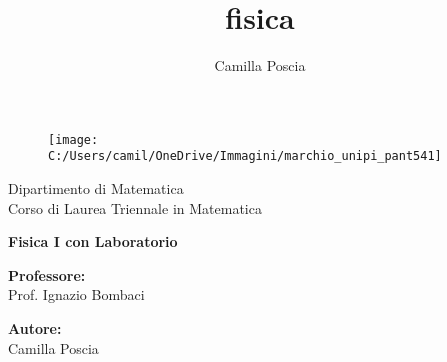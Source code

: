 \documentclass[italian,11pt,a4paper]{article}
\title{fisica}
\author{Camilla Poscia}
\begin{document}
\begin{titlepage} 
\begin{figure}
	\centering
	\texttt{[image: C:/Users/camil/OneDrive/Immagini/marchio\_unipi\_pant541]}
	\label{fig:marchiounipipant541}
\end{figure}

	\vspace{20mm}
	
	\begin{Large}
		\begin{center}
			Dipartimento di Matematica\\ Corso di Laurea Triennale in Matematica\\
			\vspace{30mm}
		
			{\huge{\bf Fisica I con Laboratorio}}\\
		\end{center}
	\end{Large}
	
	
	\vspace{7,5 cm}

	\begin{minipage}[t]{0.47\textwidth}
		{\large{\bf Professore:}\\ \large{Prof. Ignazio Bombaci}}
	\end{minipage}
	\hfill
	\begin{minipage}[t]{0.47\textwidth}\raggedleft
		{\large{\bf Autore:}\\ \large{Camilla Poscia}}
	\end{minipage}
	
	\vspace{25mm}
	
	\hrulefill
	
	\vspace{5mm}
	
	
\end{titlepage}
\end{document}
